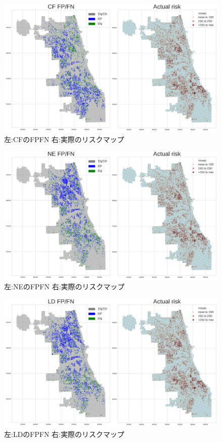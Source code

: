\begin{figure}
  \centering %
  \includegraphics[scale=0.25]{./non-crime-no-timeseries-fig/CF_fnp.png}
  \caption{左:CFのFPFN 右:実際のリスクマップ}
  \label{fig:non-crime-no-timeseries-cf-fnp}
\end{figure}

\begin{figure}
  \centering %
  \includegraphics[scale=0.25]{./non-crime-no-timeseries-fig/NE_fnp.png}
  \caption{左:NEのFPFN 右:実際のリスクマップ}
  \label{fig:non-crime-no-timeseries-ne-fnp}
\end{figure}

\begin{figure}
  \centering %
  \includegraphics[scale=0.25]{./non-crime-no-timeseries-fig/LD_fnp.png}
  \caption{左:LDのFPFN 右:実際のリスクマップ}
  \label{fig:non-crime-no-timeseries-ld-fnp}
\end{figure}

